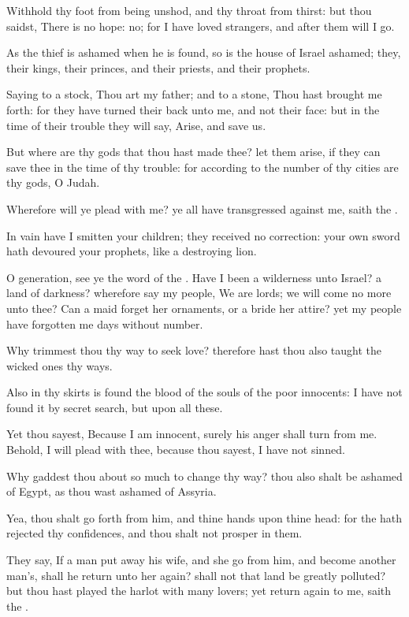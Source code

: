 \Verse Withhold thy foot from being unshod, and thy throat from thirst: but thou saidst, There is no hope: no; for I have loved strangers, and after them will I go.

\Verse As the thief is ashamed when he is found, so is the house of Israel ashamed; they, their kings, their princes, and their priests, and their prophets.

\Verse Saying to a stock, Thou art my father; and to a stone, Thou hast brought me forth: for they have turned their back unto me, and not their face: but in the time of their trouble they will say, Arise, and save us.

\Verse But where are thy gods that thou hast made thee? let them arise, if they can save thee in the time of thy trouble: for according to the number of thy cities are thy gods, O Judah.

\Verse Wherefore will ye plead with me? ye all have transgressed against me, saith the \LORD.

\Verse In vain have I smitten your children; they received no correction: your own sword hath devoured your prophets, like a destroying lion.

\Verse O generation, see ye the word of the \LORD. Have I been a wilderness unto Israel? a land of darkness? wherefore say my people, We are lords; we will come no more unto thee?  \Verse Can a maid forget her ornaments, or a bride her attire? yet my people have forgotten me days without number.

\Verse Why trimmest thou thy way to seek love? therefore hast thou also taught the wicked ones thy ways.

\Verse Also in thy skirts is found the blood of the souls of the poor innocents: I have not found it by secret search, but upon all these.

\Verse Yet thou sayest, Because I am innocent, surely his anger shall turn from me. Behold, I will plead with thee, because thou sayest, I have not sinned.

\Verse Why gaddest thou about so much to change thy way? thou also shalt be ashamed of Egypt, as thou wast ashamed of Assyria.

\Verse Yea, thou shalt go forth from him, and thine hands upon thine head: for the \LORD hath rejected thy confidences, and thou shalt not prosper in them.


\Chapter
\Verse They say, If a man put away his wife, and she go from him, and become another man's, shall he return unto her again? shall not that land be greatly polluted? but thou hast played the harlot with many lovers; yet return again to me, saith the \LORD.

